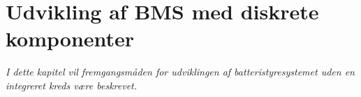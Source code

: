 \chapter{Udvikling af BMS med diskrete komponenter}\label{kap:udvikling_diskret}

\emph{I dette kapitel vil fremgangsmåden for udviklingen af batteristyresystemet uden en integreret kreds være beskrevet.}